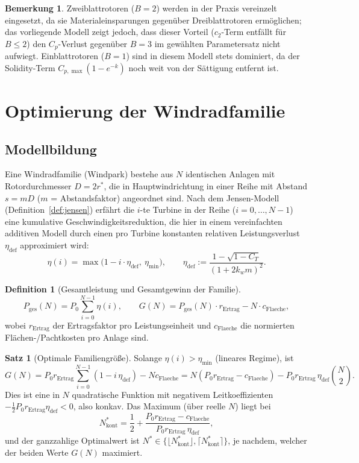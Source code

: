 ﻿\documentclass[a4paper,12pt]{article}
\theoremstyle{definition}
\newtheorem{definition}{Definition}
\newtheorem{satz}{Satz}
\newtheorem{bemerkung}{Bemerkung}
\begin{document}
\begin{bemerkung}
Zweiblattrotoren ($B=2$) werden in der Praxis vereinzelt eingesetzt, da sie Materialeinsparungen gegenüber Dreiblattrotoren ermöglichen; das vorliegende Modell zeigt jedoch, dass dieser Vorteil ($c_2$-Term entfällt für $B\le2$) den $C_p$-Verlust gegenüber $B=3$ im gewählten Parametersatz nicht aufwiegt. Einblattrotoren ($B=1$) sind in diesem Modell stets dominiert, da der Solidity-Term $C_{p,\max}(1-e^{-k})$ noch weit von der Sättigung entfernt ist.
\end{bemerkung}

\section{Optimierung der Windradfamilie}

\subsection{Modellbildung}

Eine Windradfamilie (Windpark) bestehe aus $N$ identischen Anlagen mit Rotordurchmesser $D=2r^*$, die in Hauptwindrichtung in einer Reihe mit Abstand $s=mD$ ($m$ = Abstandsfaktor) angeordnet sind. Nach dem Jensen-Modell (Definition~\ref{def:jensen}) erfährt die $i$-te Turbine in der Reihe ($i=0,\ldots,N-1$) eine kumulative Geschwindigkeitsreduktion, die hier in einem vereinfachten additiven Modell durch einen pro Turbine konstanten relativen Leistungsverlust $\eta_{\mathrm{def}}$ approximiert wird:
\[
\eta(i) = \max\bigl(1 - i\cdot\eta_{\mathrm{def}},\ \eta_{\min}\bigr), \qquad \eta_{\mathrm{def}} := \frac{1-\sqrt{1-C_T}}{(1+2k_w m)^2}.
\]

\begin{definition}[Gesamtleistung und Gesamtgewinn der Familie]
\[
P_{\mathrm{ges}}(N) = P_0 \sum_{i=0}^{N-1}\eta(i), \qquad
G(N) = P_{\mathrm{ges}}(N)\cdot r_{\mathrm{Ertrag}} - N\cdot c_{\mathrm{Flaeche}},
\]
wobei $r_{\mathrm{Ertrag}}$ der Ertragsfaktor pro Leistungseinheit und $c_{\mathrm{Flaeche}}$ die normierten Flächen-/Pachtkosten pro Anlage sind.
\end{definition}

\begin{satz}[Optimale Familiengröße]
\label{satz:familie}
Solange $\eta(i) > \eta_{\min}$ (lineares Regime), ist
\[
G(N) = P_0 r_{\mathrm{Ertrag}}\sum_{i=0}^{N-1}\left(1-i\,\eta_{\mathrm{def}}\right) - N c_{\mathrm{Flaeche}}
= N\left(P_0 r_{\mathrm{Ertrag}} - c_{\mathrm{Flaeche}}\right) - P_0 r_{\mathrm{Ertrag}}\,\eta_{\mathrm{def}}\binom{N}{2}.
\]
Dies ist eine in $N$ quadratische Funktion mit negativem Leitkoeffizienten $-\tfrac{1}{2}P_0 r_{\mathrm{Ertrag}}\eta_{\mathrm{def}}<0$, also konkav. Das Maximum (über reelle $N$) liegt bei
\[
N_{\mathrm{kont}}^* = \frac{1}{2} + \frac{P_0 r_{\mathrm{Ertrag}} - c_{\mathrm{Flaeche}}}{P_0 r_{\mathrm{Ertrag}}\,\eta_{\mathrm{def}}},
\]
und der ganzzahlige Optimalwert ist $N^* \in \{\lfloor N_{\mathrm{kont}}^*\rfloor, \lceil N_{\mathrm{kont}}^*\rceil\}$, je nachdem, welcher der beiden Werte $G(N)$ maximiert.
\end{satz}
\end{document}
